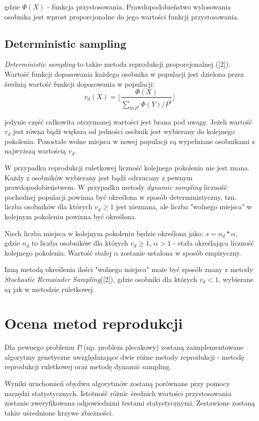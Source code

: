 \documentclass[a4paper]{article}
\begin{document}
	gdzie $\Phi(X)$ - funkcja przystosowania. Prawdopodobieństwo wylosowania osobnika jest wprost proporcjonalne do jego wartości funkcji przystosowania.
{
	\subsection{Deterministic sampling}
	{\em Deterministic sampling} to także metoda reprodukcji proporcjonalnej ([2]). Wartość funkcji dopasowania każdego osobnika w populacji jest dzielona przez średnią wartość funkcji dopasowania w populacji:
	\begin{equation}
		v_d(X) = \lfloor \frac{\Phi(X)}{\sum_{Y \epsilon P^t}{\Phi(Y)} / \overline{P^t}} \rfloor
	\end{equation}
	
	jedynie część całkowita otrzymanej wartości jest brana pod uwagę. Jeżeli wartość $v_d$ jest równa bądź większa od jedności osobnik jest wybierany do kolejnego pokolenia. Pozostałe wolne miejsca w nowej populacji są wypełniane osobnikami z najwyższą wartością $v_d$.

	W przypadku reprodukcji ruletkowej liczność kolejnego pokolenia nie jest znana. Każdy z osobników wybierany jest bądź odrzucany z pewnym prawdopodobieństwem. W przypadku metody {\em dynamic sampling} liczność pochodnej populacji powinna być określona w sposób deterministyczny, tzn. liczba osobników dla których $v_d \geq 1$ jest nieznana, ale liczba "wolnego miejsca" w kolejnym pokoleniu powinna być określona.

	Niech liczba miejsca w kolejnym pokoleniu będzie określona jako: $s = n_d * \alpha$, gdzie $n_d$ to liczba osobników dla których $v_d \geq 1$, $\alpha > 1$ - stała określająca liczność kolejnego pokolenia. Wartość stałej $\alpha$ zostanie ustalona w sposób empiryczny.

	Inną metodą określenia ilości "wolnego miejsca" może być sposób znany z metody {\em Stochastic Remainder Sampling}([2]), gdzie osobniki dla których $v_d < 1$, wybierane są jak w metodzie ruletkowej.

	\section{Ocena metod reprodukcji}
	Dla pewnego problemu $P$ (np. problem plecakowy) zostaną zaimplementowane algorytmy genetyczne uwzględniające dwie różne metody reprodukcji - metodę reprodukcji ruletkowej oraz metodę dynamic sampling.

	Wyniki uruchomień obydwu algorytmów zostaną porównane przy pomocy narzędzi statystycznych. Istotność różnic średnich wartości przystosowania zostanie zweryfikowana odpowiednimi testami statystycznymi. Zestawione zostaną także uśrednione krzywe zbieżności.

}
\end{document}
